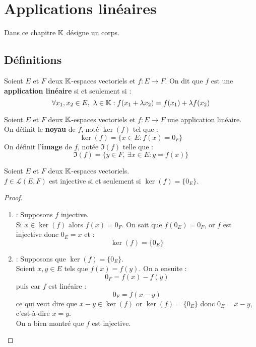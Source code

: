 \chapter{Applications linéaires}
\def\arraystretch{1}

\par \noindent Dans ce chapitre $\mathbb{K}$ désigne un corps.

\section{Définitions}
\begin{definition}
    Soient $E$ et $F$ deux $\mathbb{K}$-espaces vectoriels et $f : E \to F$.
    On dit que $f$ est une \textbf{application linéaire} si et seulement si : 
    \[ \forall x_1, x_2 \in E,\ \lambda \in \mathbb{K} : f(x_1 + \lambda x_2) = f(x_1) + \lambda f(x_2) \]
\end{definition}

\begin{definition}
    Soient $E$ et $F$ deux $\mathbb{K}$-espaces vectoriels et $f : E \to F$ une application linéaire.
    \\
    On définit le \textbf{noyau} de $f$, noté $\ker(f)$ tel que :
    \[ \ker(f) = \{ x \in E : f(x) = 0_F \} \] 
    On définit l'\textbf{image} de $f$, notée $\Im(f)$ telle que :
    \[ \Im(f) = \{ y \in F,\ \exists x \in E : y = f(x) \} \]
\end{definition}

\begin{theorem}
	Soient $E$ et $F$ deux $\mathbb{K}$-espaces vectoriels. \\
	$f \in \mathcal{L}(E, F)$ est injective si et seulement si $\ker(f) = \{ 0_E \}$.
\end{theorem}

\begin{proof}
	\leavevmode
	\begin{enumerate}
		\item \boxed{\implies} : Supposons $f$ injective.
		\\
		Si $x \in \ker(f)$ alors $f(x) = 0_F$. On sait que $f(0_E) = 0_F$, or $f$ est injective donc $0_E = x$ et :
		\[ \ker(f) = \{ 0_E \} \]
		\item \boxed{\impliedby} : Supposons que $\ker(f) = \{ 0_E \}$.
		\\
		Soient $x, y \in E$ tels que $f(x) = f(y)$.
		On a ensuite :
		\[ 0_F = f(x) - f(y) \]
		puis car $f$ est linéaire :
		\[ 0_F = f(x - y) \]
		ce qui veut dire que $x - y \in \ker(f)$ or $\ker(f) = \{ 0_E \}$ donc $0_E = x - y$, c'est-à-dire $x = y$.
		\\
		On a bien montré que $f$ est injective.
	\end{enumerate}
\end{proof}

